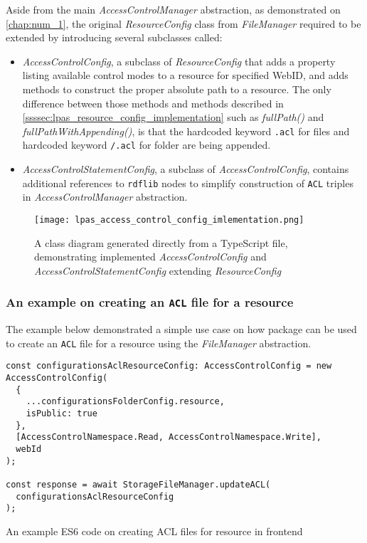 Aside from the main \textit{AccessControlManager} abstraction, as demonstrated on \autoref{chap:num_1}, the original \textit{ResourceConfig} class from \textit{FileManager} required to be extended by introducing several subclasses called:
\begin{itemize}
	\item \textit{AccessControlConfig}, a subclass of \textit{ResourceConfig} that adds a property listing available control modes to a resource for specified WebID, and adds methods to construct the proper absolute path to a resource. The only difference between those methods and methods described in \autoref{ssssec:lpas_resource_config_implementation} such as \textit{fullPath()} and \textit{fullPathWithAppending()}, is that the hardcoded keyword \texttt{.acl} for files and hardcoded keyword \texttt{/.acl} for folder are being appended.
	\item \textit{AccessControlStatementConfig}, a subclass of \textit{AccessControlConfig}, contains additional references to \texttt{rdflib} nodes to simplify construction of \texttt{ACL} triples in \textit{AccessControlManager} abstraction.
\end{itemize}

\begin{figure}[h]
\centering
\texttt{[image: lpas\_access\_control\_config\_imlementation.png]}
\caption{A class diagram generated directly from a TypeScript file, demonstrating implemented \textit{AccessControlConfig} and \textit{AccessControlStatementConfig} extending \textit{ResourceConfig}}
\label{fig:lpas_access_control_config_imlementation}
\end{figure}

\subsubsection{An example on creating an \texttt{ACL} file for a \solid{} resource}

The example below demonstrated a simple use case on how \lpas{} package can be used to create an \texttt{ACL} file for a \solid{} resource using the \textit{FileManager} abstraction. 

\begin{listing}[H]    
\begin{verbatim}
const configurationsAclResourceConfig: AccessControlConfig = new AccessControlConfig(
  {
    ...configurationsFolderConfig.resource,
    isPublic: true
  },
  [AccessControlNamespace.Read, AccessControlNamespace.Write],
  webId
);

const response = await StorageFileManager.updateACL(
  configurationsAclResourceConfig
);
\end{verbatim}
\caption{An example ES6 code on creating ACL files for \solid{} resource in \lpa{} frontend} 
\label{lst:acl_creation_lpa_example}
\end{listing}

